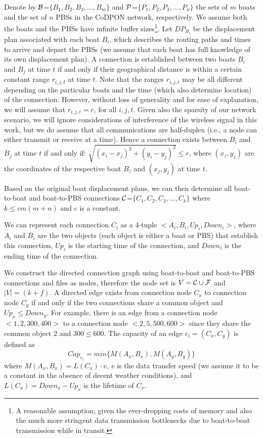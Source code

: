 \documentclass[conference]{IEEEtran}
\begin{document}
Denote by $\cal B$=$\{B_1,B_2,B_3, ... ,B_m\}$ and $\cal P$=$\{P_1,P_2,P_3, ... ,P_n\}$ the sets of $m$ boats and the set of $n$ PBSs in the CoDPON network, respectively. We assume both the boats and the PBSs have infinite buffer sizes\footnote{A reasonable assumption, given the ever-dropping costs of memory and also the much more stringent data transmission bottlenecks due to boat-to-boat transmission while in transit.}. Let $DP_{B_i}$ be the displacement plan associated with each boat $B_i$, which describes the routing paths and times to arrive and depart the PBSs (we assume that each boat has full knowledge of its own displacement plan). A connection is established between two boats $B_i$ and $B_j$ at time $t$ if and only if their geographical distance is within a certain constant range $r_{i,j,t}$ at time $t$. Note that the ranges $r_{i,j,t}$ may be all different depending on the particular boats and the time (which also determine location) of the connection. However, without loss of generality and for ease of explanation, we will assume that $r_{i,j,t}=r$, for all $i,j,t$.  Given also the sparsity of our network scenario, we will ignore considerations of interference of the wireless signal in this work, but we do assume that all communications are half-duplex (i.e., a node can either transmit or receive at a time). Hence a connection exists between $B_i$ and $B_j$ at time $t$ if and only if: $\sqrt{(x_i - x_j)^2 + (y_i - y_j)^2} \leq r$, where $(x_z,y_z)$ are the coordinates of the respective boat  $B_z$ and $(x_j,y_j)$ at time $t$.

Based on the original boat displacement plans, we can then determine all boat-to-boat and boat-to-PBS connections $\cal C$=$\{C_1,C_2,C_3, ... ,C_k\}$ where $k \leq cm(m+n)$ and $c$ is a constant.

We can represent each connection $C_i$ as a 4-tuple $<A_i, B_i, Up_i, Down_i>$, where $A_i$ and $B_i$ are the two objects (each object is either a boat or PBS) that establish this connection, $Up_i$ is the starting time of the connection, and $Down_i$ is the ending time of the connection.

We construct the directed connection graph using boat-to-boat and boat-to-PBS connections and files as nodes, therefore the node set is $V = {\cal C} \cup {\cal F}$ and $|V|=(k+f)$. A directed edge exists from connection node $C_x$ to connection node $C_y$ if and only if the two connections share a common object and $Up_x \le Down_y$. For example, there is an edge from a connection node $<1, 2, 300, 400>$ to a connection node $<2, 5, 500, 600>$ since they share the common object $2$ and $300 \le 600$. The capacity of an edge $e_i=(C_x,C_y)$ is defined as
\begin{equation} \nonumber
Cap_{e_i} = min\{M(A_x,B_x),M(A_y,B_y)\}
\end{equation}
where $M(A_x,B_x) = L(C_x) \cdot v$,  $v$ is the data transfer speed (we assume it to be a constant in the absence of decent weather conditions), and $L(C_x)=Down_x-Up_x$ is the lifetime of $C_x$.
\end{document}
